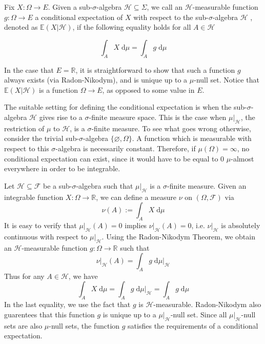 Fix $X : \Omega \rightarrow E$. Given a sub-$\sigma$-algebra $\mathcal{H} \subseteq \Sigma$, we call an $\mathcal{H}$-measurable function $g : \Omega \rightarrow E$ a conditional expectation of $X$ with respect to the sub-$\sigma$-algebra $\mathcal{H}$ , denoted as $\mathbb{E}(X \vert \mathcal{H})$, if the following equality holds for all $A \in \mathcal{H}$

\[
	\int_A X \; \textrm{d} \mu = \int_A g \; \textrm{d} \mu
\]

In the case that $E = \mathbb{R}$, it is straightforward to show that such a function $g$ always exists (via Radon-Nikodym), and is unique up to a $\mu$-null set. Notice that $\mathbb{E}(X \vert \mathcal{H})$ is a function $\Omega \rightarrow E$, as opposed to some value in $E$.

The suitable setting for defining the conditional expectation is when the sub-$\sigma$-algebra $\mathcal{H}$ gives rise to a $\sigma$-finite measure space. This is the case when $\mu\vert_\mathcal{H}$, the restriction of $\mu$ to $\mathcal{H}$, is a $\sigma$-finite measure. To see what goes wrong otherwise, consider the trivial sub-$\sigma$-algebra $\{\varnothing, \Omega\}$. A function which is measurable with respect to this $\sigma$-algebra is necessarily constant. Therefore, if $\mu(\Omega) = \infty$, no conditional expectation can exist, since it would have to be equal to $0$ $\mu$-almost everywhere in order to be integrable.

\vspace{0.3cm}
\begin{example}
Let $\mathcal{H} \subseteq \mathcal{F}$ be a sub-$\sigma$-algebra such that $\mu\vert_\mathcal{H}$ is a $\sigma$-finite measure. Given an integrable function $X : \Omega \rightarrow \mathbb{R}$, we can define a measure $\nu$ on $(\Omega, \mathcal{F})$ via
\[
	\nu(A) := \int_A X \; \textrm{d}\mu
\]
It is easy to verify that $\mu\vert_\mathcal{H}(A) = 0$ implies $\nu\vert_\mathcal{H}(A) = 0$, i.e. $\nu\vert_\mathcal{H}$ is absolutely continuous with respect to $\mu\vert_\mathcal{H}$. Using the Radon-Nikodym Theorem, we obtain an $\mathcal{H}$-measurable function $g : \Omega \rightarrow \mathbb{R}$ such that
\[
	\nu\vert_\mathcal{H}(A) = \int_A g \;\textrm{d}\mu\vert_\mathcal{H}
\]
Thus for any $A \in \mathcal{H}$, we have
\[
	\int_A X \; \textrm{d}\mu = \int_A g \;\textrm{d}\mu\vert_\mathcal{H} = \int_A g \;\textrm{d}\mu
\]
In the last equality, we use the fact that $g$ is $\mathcal{H}$-measurable. Radon-Nikodym also guarentees that this function $g$ is unique up to a $\mu\vert_\mathcal{H}$-null set. Since all $\mu\vert_\mathcal{H}$-null sets are also $\mu$-null sets, the function $g$ satisfies the requirements of a conditional expectation.
\end{example}
\vspace{0.3cm}

